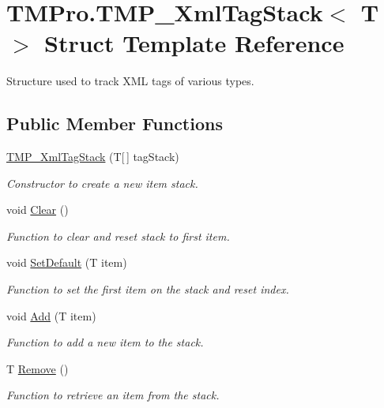 \hypertarget{struct_t_m_pro_1_1_t_m_p___xml_tag_stack}{}\section{T\+M\+Pro.\+T\+M\+P\+\_\+\+Xml\+Tag\+Stack$<$ T $>$ Struct Template Reference}
\label{struct_t_m_pro_1_1_t_m_p___xml_tag_stack}


Structure used to track X\+ML tags of various types.  


\subsection*{Public Member Functions}
\begin{DoxyCompactItemize}
\item 
\mbox{\hyperlink{struct_t_m_pro_1_1_t_m_p___xml_tag_stack_ac4cb25bb25d021c5422260abb637d03c}{T\+M\+P\+\_\+\+Xml\+Tag\+Stack}} (T\mbox{[}$\,$\mbox{]} tag\+Stack)
\begin{DoxyCompactList}\small\item\em Constructor to create a new item stack. \end{DoxyCompactList}\item 
void \mbox{\hyperlink{struct_t_m_pro_1_1_t_m_p___xml_tag_stack_a58f2d9eef0b3308d87ffe390e223bced}{Clear}} ()
\begin{DoxyCompactList}\small\item\em Function to clear and reset stack to first item. \end{DoxyCompactList}\item 
void \mbox{\hyperlink{struct_t_m_pro_1_1_t_m_p___xml_tag_stack_ad52f00950a34e1e83d61ebc1153e520e}{Set\+Default}} (T item)
\begin{DoxyCompactList}\small\item\em Function to set the first item on the stack and reset index. \end{DoxyCompactList}\item 
void \mbox{\hyperlink{struct_t_m_pro_1_1_t_m_p___xml_tag_stack_a7b6e4450b0e7d4b3381a8cfc45c3735e}{Add}} (T item)
\begin{DoxyCompactList}\small\item\em Function to add a new item to the stack. \end{DoxyCompactList}\item 
T \mbox{\hyperlink{struct_t_m_pro_1_1_t_m_p___xml_tag_stack_a689428651bbcdfe87633c93ef8c6663c}{Remove}} ()
\begin{DoxyCompactList}\small\item\em Function to retrieve an item from the stack. \end{DoxyCompactList}\item 

\end{DoxyCompactItemize}
